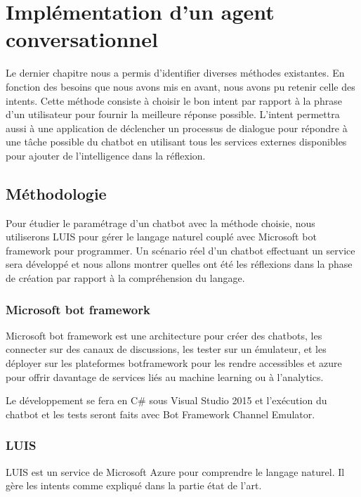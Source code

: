\graphicspath{{solutionImages/}}
\chapter{Implémentation d’un agent conversationnel}

Le dernier chapitre nous a permis d’identifier diverses méthodes existantes. En fonction des besoins que nous avons mis en avant, nous avons pu retenir celle des intents. Cette méthode consiste à choisir le bon intent par rapport à la phrase d’un utilisateur pour fournir la meilleure réponse possible. L’intent permettra aussi à une application de déclencher un processus de dialogue pour répondre à une tâche possible du chatbot en utilisant tous les services externes disponibles pour ajouter de l’intelligence dans la réflexion.

\section{Méthodologie}

Pour étudier le paramétrage d’un chatbot avec la méthode choisie, nous utiliserons LUIS pour gérer le langage naturel couplé avec Microsoft bot framework pour programmer. Un scénario réel d’un chatbot effectuant un service sera développé et nous allons montrer quelles ont été les réflexions dans la phase de création par rapport à la compréhension du langage.

\subsection{Microsoft bot framework}

Microsoft bot framework est une architecture pour créer des chatbots, les connecter sur des canaux de discussions, les tester sur un émulateur, et les déployer sur les plateformes botframework pour les rendre accessibles et azure pour offrir davantage de services liés au machine learning ou à l’analytics.
\vspace{1em}

Le développement se fera en C\# sous Visual Studio 2015 et l’exécution du chatbot et les tests seront faits avec Bot Framework Channel Emulator.

\subsection{LUIS}

LUIS est un service de Microsoft Azure pour comprendre le langage naturel. Il gère les intents comme expliqué dans la partie état de l’art.
\vspace{1em}

